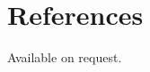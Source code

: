 \documentclass[12pt,a4paper]{article}
\begin{document}


\section{References}
Available on request.
\end{document}
